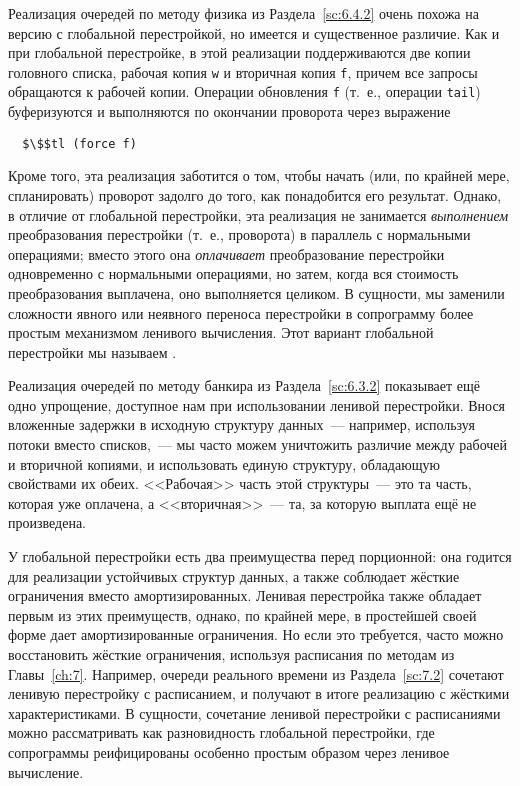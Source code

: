Реализация очередей по методу физика из Раздела~\ref{sc:6.4.2} очень
похожа на версию с глобальной перестройкой, но имеется и существенное
различие. Как и при глобальной перестройке, в этой реализации
поддерживаются две копии головного списка, рабочая копия \lstinline!w!
и вторичная копия \lstinline!f!, причем все запросы обращаются к
рабочей копии. Операции обновления \lstinline!f! (т.~е., операции
\lstinline!tail!) буферизуются и выполняются по окончании проворота
через выражение
\begin{lstlisting}
  $\$$tl (force f)
\end{lstlisting}
Кроме того, эта реализация заботится о том, чтобы начать
(или, по крайней мере, спланировать) проворот задолго до того, как
понадобится его результат. Однако, в отличие от глобальной
перестройки, эта реализация не занимается \emph{выполнением}
преобразования перестройки (т.~е., проворота) в параллель с нормальными
операциями; вместо этого она \emph{оплачивает} преобразование
перестройки одновременно с нормальными операциями, но затем, когда вся
стоимость преобразования выплачена, оно выполняется целиком. В
сущности, мы заменили сложности явного или неявного переноса
перестройки в сопрограмму более простым механизмом ленивого
вычисления. Этот вариант глобальной перестройки мы называем
.

Реализация очередей по методу банкира из Раздела~\ref{sc:6.3.2}
показывает ещё одно упрощение, доступное нам при использовании ленивой
перестройки. Внося вложенные задержки в исходную структуру данных~---
например, используя потоки вместо списков,~--- мы часто можем
уничтожить различие между рабочей и вторичной копиями, и использовать
единую структуру, обладающую свойствами их обеих. <<Рабочая>> часть
этой структуры~--- это та часть, которая уже оплачена, а
<<вторичная>>~--- та, за которую выплата ещё не произведена.

У глобальной перестройки есть два преимущества перед
порционной: она годится для реализации устойчивых структур данных, а
также соблюдает жёсткие ограничения вместо амортизированных. Ленивая
перестройка также обладает первым из этих преимуществ, однако, по
крайней мере, в простейшей своей форме дает амортизированные
ограничения. Но если это требуется, часто можно восстановить
жёсткие ограничения, используя расписания по методам из
Главы~\ref{ch:7}. Например, очереди реального времени из
Раздела~\ref{sc:7.2} сочетают ленивую перестройку с расписанием, и
получают в итоге реализацию с жёсткими характеристиками. В сущности,
сочетание ленивой перестройки с расписаниями можно рассматривать как
разновидность глобальной перестройки, где сопрограммы реифицированы
особенно простым образом через ленивое вычисление.

